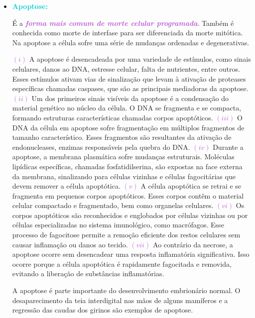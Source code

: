 \documentclass[11pt,a4paper]{article}
\newcounter{exemplo}
\begin{document}
\begin{itemize}[label=\textcolor{CarnationPink}{$\blacktriangleright$}]
		\item \textcolor{DarkTurquoise}{\LobsterTwo\Large\textbf{Apoptose:}}
		
		É a \textcolor{MediumOrchid}{\textbf{\textit{forma mais comum de morte celular programada}}}. Também é conhecida como morte de interfase para ser diferenciada da morte mitótica. Na apoptose a célula sofre uma série de mudanças ordenadas e degenerativas.

		\textcolor{MediumOrchid}{$(i)$} A apoptose é desencadeada por uma variedade de estímulos, como sinais celulares, danos ao DNA, estresse celular, falta de nutrientes, entre outros. Esses estímulos ativam vias de sinalização que levam à ativação de proteases específicas chamadas caspases, que são as principais mediadoras da apoptose. \textcolor{MediumOrchid}{$(ii)$} Um dos primeiros sinais visíveis da apoptose é a condensação do material genético no núcleo da célula. O DNA se fragmenta e se compacta, formando estruturas características chamadas corpos apoptóticos. \textcolor{MediumOrchid}{$(iii)$} O DNA da célula em apoptose sofre fragmentação em múltiplos fragmentos de tamanho característico. Esses fragmentos são resultantes da ativação de endonucleases, enzimas responsáveis pela quebra do DNA. \textcolor{MediumOrchid}{$(iv)$}  Durante a apoptose, a membrana plasmática sofre mudanças estruturais. Moléculas lipídicas específicas, chamadas fosfatidilserina, são expostas na face externa da membrana, sinalizando para células vizinhas e células fagocitárias que devem remover a célula apoptótica. \textcolor{MediumOrchid}{$(v)$}  A célula apoptótica se retrai e se fragmenta em pequenos corpos apoptóticos. Esses corpos contêm o material celular compactado e fragmentado, bem como organelas celulares. \textcolor{MediumOrchid}{$(vi)$}  Os corpos apoptóticos são reconhecidos e englobados por células vizinhas ou por células especializadas no sistema imunológico, como macrófagos. Esse processo de fagocitose permite a remoção eficiente dos restos celulares sem causar inflamação ou danos ao tecido. \textcolor{MediumOrchid}{$(vii)$} Ao contrário da necrose, a apoptose ocorre sem desencadear uma resposta inflamatória significativa. Isso ocorre porque a célula apoptótica é rapidamente fagocitada e removida, evitando a liberação de substâncias inflamatórias.

		A apoptose é parte importante do desenvolvimento embrionário normal. O desaparecimento da teia interdigital nas mãos de alguns mamíferos e a regressão das caudas dos girinos são exemplos de apoptose. 


\end{itemize}
\end{document}
